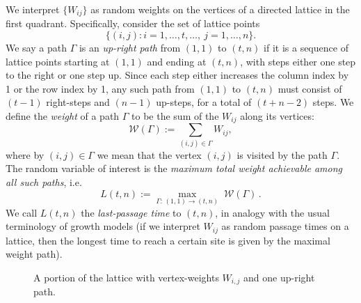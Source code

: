 \documentclass[letterpaper,11pt,oneside,reqno]{book}
\numberwithin{equation}{chapter}  %
\theoremstyle{definition}
\begin{document}
We interpret $\{W_{ij}\}$ as random weights on the vertices of a directed lattice in the first quadrant. Specifically, consider the set of lattice points
\[ \{(i,j): i=1,\ldots,t,\ldots ,\ j=1,\dots,n\}.\]
We say a path $\Gamma$ is an \emph{up-right path} from
$(1,1)$ to $(t,n)$ if it is a sequence of lattice points
starting at $(1,1)$ and ending at $(t,n)$, with steps either
one step to the right or one step up. Since each step
either increases the column index by 1 or the row index by
1, any such path from $(1,1)$ to $(t,n)$ must consist of
$(t-1)$ right-steps and $(n-1)$ up-steps, for a total of
$(t+n-2)$ steps. We define the \emph{weight} of a path
$\Gamma$ to be the sum of the $W_{ij}$ along its vertices:
\[ \mathcal{W}(\Gamma) := \sum_{(i,j)\in \Gamma} W_{ij}, \]
where by $(i,j)\in \Gamma$ we mean that the vertex $(i,j)$ is visited by the path $\Gamma$. The random variable of interest is the \emph{maximum total weight achievable among all such paths}, i.e.
\begin{equation}\label{lecture13:eq:last-passage-time}
L(t,n) := \max_{\Gamma:\, (1,1)\to(t,n)} \; \mathcal{W}(\Gamma)\,.
\end{equation}
We call $L(t,n)$ the \emph{last-passage time} to $(t,n)$, in analogy with the usual terminology of growth models (if we interpret $W_{ij}$ as random passage times on a lattice, then the longest time to reach a certain site is given by the maximal weight path).

\begin{figure}[ht]
\centering
{}
\caption{A portion of the lattice with vertex-weights $W_{i,j}$ and one up-right path.}
\label{lecture13:fig:LPP_array}
\end{figure}
\end{document}

